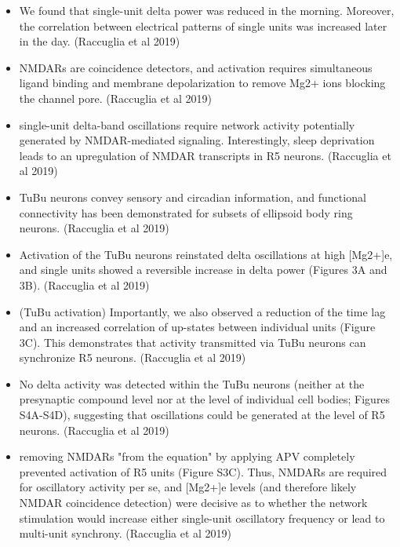 \documentclass[11pt]{article}
\begin{document}
\begin{itemize}
    \item We found that single-unit delta power was reduced in the morning. Moreover, the correlation between electrical patterns of single units was increased later in the day.
    \cite{raccugliaNetworkSpecificSynchronizationElectrical2019} (Raccuglia et al 2019)

    \item NMDARs are coincidence detectors, and activation requires simultaneous ligand binding and membrane depolarization to remove Mg2+ ions blocking the channel pore.
    \cite{raccugliaNetworkSpecificSynchronizationElectrical2019} (Raccuglia et al 2019)

    \item single-unit delta-band oscillations require network activity potentially generated by NMDAR-mediated signaling. Interestingly, sleep deprivation leads to an upregulation of NMDAR transcripts in R5 neurons.
    \cite{raccugliaNetworkSpecificSynchronizationElectrical2019} (Raccuglia et al 2019)

    \item TuBu neurons convey sensory and circadian information, and functional connectivity has been demonstrated for subsets of ellipsoid body ring neurons.
    \cite{raccugliaNetworkSpecificSynchronizationElectrical2019} (Raccuglia et al 2019)

    \item Activation of the TuBu neurons reinstated delta oscillations at high [Mg2+]e, and single units showed a reversible increase in delta power (Figures 3A and 3B).
    \cite{raccugliaNetworkSpecificSynchronizationElectrical2019} (Raccuglia et al 2019)

    \item (TuBu activation) Importantly, we also observed a reduction of the time lag and an increased correlation of up-states between individual units (Figure 3C). This demonstrates that activity transmitted via TuBu neurons can synchronize R5 neurons.
    \cite{raccugliaNetworkSpecificSynchronizationElectrical2019} (Raccuglia et al 2019)

    \item No delta activity was detected within the TuBu neurons (neither at the presynaptic compound level nor at the level of individual cell bodies; Figures S4A-S4D), suggesting that oscillations could be generated at the level of R5 neurons.
    \cite{raccugliaNetworkSpecificSynchronizationElectrical2019} (Raccuglia et al 2019)

    \item removing NMDARs "from the equation" by applying APV completely prevented activation of R5 units (Figure S3C). Thus, NMDARs are required for oscillatory activity per se, and [Mg2+]e levels (and therefore likely NMDAR coincidence detection) were decisive as to whether the network stimulation would increase either single-unit oscillatory frequency or lead to multi-unit synchrony.
    \cite{raccugliaNetworkSpecificSynchronizationElectrical2019} (Raccuglia et al 2019)


\end{itemize}
\end{document}
